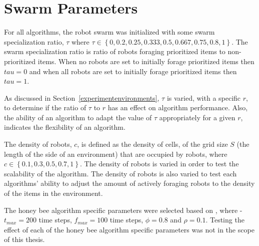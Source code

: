 \begin{algorithm}
\begin{algorithmic}[1]
		\State {}
		\State {}
		\State {}
				
			\State {}
				\State {}
				\State {}	
			\EndIf
		\EndWhile
	\EndIf
	\EndIf
\EndWhile

\EndFunction
\end{algorithmic}
\end{algorithm}

\section{Swarm Parameters}
\label{parameters}

For all algorithms, the robot swarm was initialized with 
some swarm specialization ratio, $\tau$ where $\tau\in\left\{0, 0.2, 0.25, 0.333, 0.5, 0.667, 0.75, 0.8,1\right\}$. The swarm specialization ratio is ratio of robots foraging prioritized items to non-prioritized items. When no robots are set to initially forage prioritized items then $tau=0$ and when all robots are set to initially forage prioritized items then $tau=1$.

As discussed in Section~\ref{experimentenvironments}, $\tau$ is varied, with a specific $r$, to determine if the ratio of $\tau$ to $r$ has an effect on algorithm performance. Also, the ability of an algorithm to adapt the value of $\tau$ appropriately for a given $r$, indicates the flexibility of an algorithm. %

The density of robots, $c$, is defined as the density of cells, of the grid size $S$ (the length of the side of an environment) that are occupied by robots, where $c\in\left\{0.1, 0.3, 0.5, 0.7, 1\right\}$. The density of robots is varied in order to test the scalability of the algorithm. The density of robots is also varied to test each algorithms' ability to adjust the amount of actively  foraging robots to the density of the items in the environment.

The honey bee algorithm specific parameters were selected based on \cite{seeley2009wisdom}, where
-$t_{max}=200$ time steps, $f_{max}=100$ time steps, $\phi=0.8$ and $\rho=0.1$. Testing the effect of each of the honey bee algorithm specific parameters was not in the scope of this thesis.

